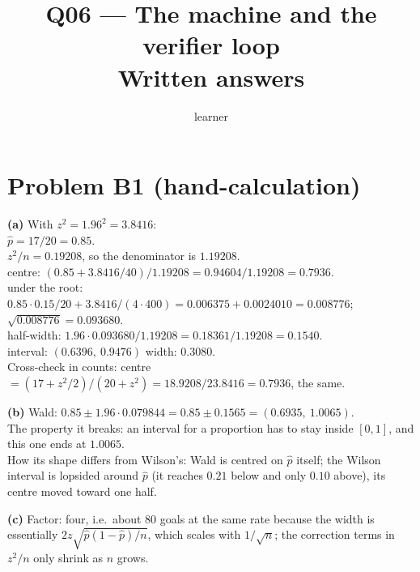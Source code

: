 \documentclass[11pt]{article}
\title{Q06 --- The machine and the verifier loop \\ \large Written answers}
\author{learner}
\date{}
\begin{document}
\maketitle

\section*{Problem B1 (hand-calculation)}\label{ans:B1}
\begin{answer}
\textbf{(a)} With $z^2 = 1.96^2 = 3.8416$: \\
$\hat p = 17/20 = 0.85$. \\
$z^2/n = 0.19208$, so the denominator is $1.19208$. \\
centre: $(0.85 + 3.8416/40)/1.19208 = 0.94604/1.19208 = 0.7936$. \\
under the root: $0.85 \cdot 0.15/20 + 3.8416/(4 \cdot 400) = 0.006375 + 0.0024010
= 0.008776$; $\sqrt{0.008776} = 0.093680$. \\
half-width: $1.96 \cdot 0.093680/1.19208 = 0.18361/1.19208 = 0.1540$. \\
interval: $(0.6396,\ 0.9476)$ \quad width: $0.3080$. \\
Cross-check in counts: centre $= (17 + z^2/2)/(20 + z^2) = 18.9208/23.8416 = 0.7936$,
the same.

\textbf{(b)} Wald: $0.85 \pm 1.96 \cdot 0.079844 = 0.85 \pm 0.1565 = (0.6935,\ 1.0065)$. \\
The property it breaks: an interval for a proportion has to stay inside
$[0, 1]$, and this one ends at $1.0065$. \\
How its shape differs from Wilson's: Wald is centred on $\hat p$ itself; the
Wilson interval is lopsided around $\hat p$ (it reaches $0.21$ below and only
$0.10$ above), its centre moved toward one half.

\textbf{(c)} Factor: four, i.e.\ about 80 goals at the same rate \quad because the
width is essentially $2z\sqrt{\hat p(1-\hat p)/n}$, which scales with
$1/\sqrt{n}$; the correction terms in $z^2/n$ only shrink as $n$ grows.
\end{answer}

\end{document}
